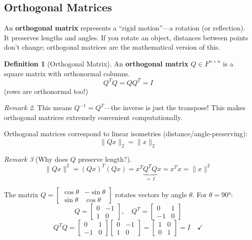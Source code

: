 \documentclass[11pt]{article}
\theoremstyle{definition}
\newtheorem{definition}{Definition}[section]
\theoremstyle{plain}
\theoremstyle{remark}
\newtheorem{remark}[definition]{Remark}
\begin{document}
\subsection{Orthogonal Matrices}

\begin{intuitionbox}
An \textbf{orthogonal matrix} represents a ``rigid motion''---a rotation (or reflection). It preserves lengths and angles. If you rotate an object, distances between points don't change; orthogonal matrices are the mathematical version of this.
\end{intuitionbox}

\begin{definition}[Orthogonal Matrix]
An \textbf{orthogonal matrix} $Q \in F^{n \times n}$ is a square matrix with orthonormal columns.
\[
Q^T Q = QQ^T = I
\]
(rows are orthonormal too!)
\end{definition}

\begin{remark}
This means $Q^{-1} = Q^T$---the inverse is just the transpose! This makes orthogonal matrices extremely convenient computationally.
\end{remark}

Orthogonal matrices correspond to linear isometries (distance/angle-preserving):
\[
\|Qx\|_2 = \|x\|_2
\]

\begin{remark}[Why does $Q$ preserve length?]
\[
\|Qx\|^2 = (Qx)^T(Qx) = x^T \underbrace{Q^T Q}_{=\,I} x = x^T x = \|x\|^2
\]
\end{remark}

\begin{workedexample}[title=\textbf{Worked Example: A 2D rotation matrix}]
The matrix $Q = \begin{bmatrix}\cos\theta & -\sin\theta\\\sin\theta & \cos\theta\end{bmatrix}$ rotates vectors by angle $\theta$. For $\theta = 90°$:
\[
Q = \begin{bmatrix}0 & -1\\1 & 0\end{bmatrix}, \quad Q^T = \begin{bmatrix}0 & 1\\-1 & 0\end{bmatrix}
\]
\[
Q^T Q = \begin{bmatrix}0 & 1\\-1 & 0\end{bmatrix}\begin{bmatrix}0 & -1\\1 & 0\end{bmatrix} = \begin{bmatrix}1 & 0\\0 & 1\end{bmatrix} = I \quad \checkmark
\]
\end{workedexample}
\end{document}
